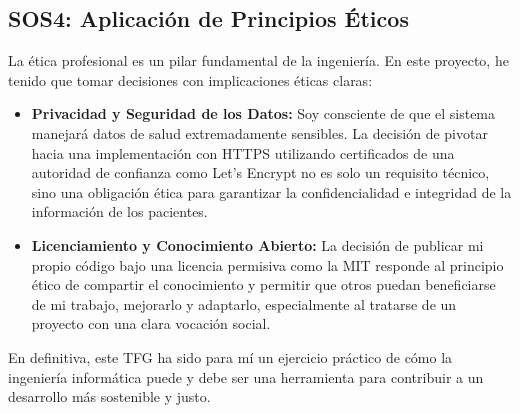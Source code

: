 \subsection{SOS4: Aplicación de Principios Éticos}
La ética profesional es un pilar fundamental de la ingeniería. En este proyecto, he tenido que tomar decisiones con implicaciones éticas claras:
\begin{itemize}
    \item \textbf{Privacidad y Seguridad de los Datos:} Soy consciente de que el sistema manejará datos de salud extremadamente sensibles. La decisión de pivotar hacia una implementación con HTTPS utilizando certificados de una autoridad de confianza como Let's Encrypt no es solo un requisito técnico, sino una obligación ética para garantizar la confidencialidad e integridad de la información de los pacientes.
    \item \textbf{Licenciamiento y Conocimiento Abierto:} La decisión de publicar mi propio código bajo una licencia permisiva como la MIT responde al principio ético de compartir el conocimiento y permitir que otros puedan beneficiarse de mi trabajo, mejorarlo y adaptarlo, especialmente al tratarse de un proyecto con una clara vocación social.
\end{itemize}
En definitiva, este TFG ha sido para mí un ejercicio práctico de cómo la ingeniería informática puede y debe ser una herramienta para contribuir a un desarrollo más sostenible y justo.